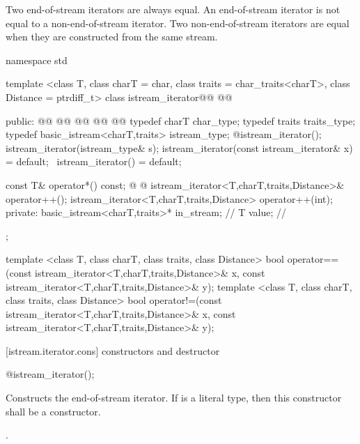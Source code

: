 \pnum
Two end-of-stream iterators are always equal.
An end-of-stream iterator is not
equal to a non-end-of-stream iterator.
Two non-end-of-stream iterators are equal when they are constructed from the same stream.

\begin{codeblock}
namespace std {
  template <class T, class charT = char, class traits = char_traits<charT>,
      class Distance = ptrdiff_t>
  class istream_iterator@\removed{:}@
    @@ {
  public:
    @@
    @@
    @@
    @@
    @@
    typedef charT char_type;
    typedef traits traits_type;
    typedef basic_istream<charT,traits> istream_type;
    @\seebelow@ istream_iterator();
    istream_iterator(istream_type& s);
    istream_iterator(const istream_iterator& x) = default;
   ~istream_iterator() = default;

    const T& operator*() const;
    @ @
    istream_iterator<T,charT,traits,Distance>& operator++();
    istream_iterator<T,charT,traits,Distance>  operator++(int);
  private:
    basic_istream<charT,traits>* in_stream; // \expos
    T value;                                // \expos
  };

  template <class T, class charT, class traits, class Distance>
    bool operator==(const istream_iterator<T,charT,traits,Distance>& x,
            const istream_iterator<T,charT,traits,Distance>& y);
  template <class T, class charT, class traits, class Distance>
    bool operator!=(const istream_iterator<T,charT,traits,Distance>& x,
            const istream_iterator<T,charT,traits,Distance>& y);
}
\end{codeblock}

[istream.iterator.cons]{ constructors and destructor}


%
\begin{itemdecl}
@\seebelow@ istream_iterator();
\end{itemdecl}

\begin{itemdescr}
\pnum
\effects
Constructs the end-of-stream iterator. If  is a literal type, then this
constructor shall be a  constructor.

\pnum
\postcondition {}.
\end{itemdescr}


